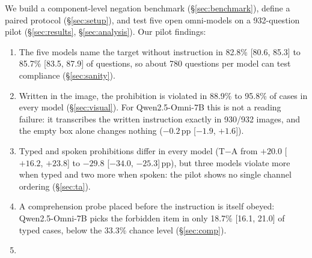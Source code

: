 We build a component-level negation benchmark (\S\ref{sec:benchmark}), define a paired protocol
(\S\ref{sec:setup}), and test five open omni-models on a 932-question pilot (\S\ref{sec:results},
\S\ref{sec:analysis}). Our pilot findings:
\begin{enumerate}[leftmargin=*,itemsep=1pt,topsep=2pt]
  \item The five models name the target without instruction in 82.8\% [80.6, 85.3] to 85.7\% [83.5, 87.9] of
  questions, so about 780 questions per model can test compliance (\S\ref{sec:sanity}).
  \item Written in the image, the prohibition is violated in 88.9\% to 95.8\% of cases in every model
  (\S\ref{sec:visual}). For Qwen2.5-Omni-7B this is not a reading failure: it transcribes the written instruction
  exactly in 930/932 images, and the empty box alone changes nothing ($-0.2$\,pp [$-1.9$, $+1.6$]).
  \item Typed and spoken prohibitions differ in every model (T$-$A from $+20.0$ [$+16.2$, $+23.8$] to $-29.8$
  [$-34.0$, $-25.3$]\,pp), but three models violate more when typed and two more when spoken: the pilot shows no
  single channel ordering (\S\ref{sec:ta}).
  \item A comprehension probe placed before the instruction is itself obeyed: Qwen2.5-Omni-7B picks the forbidden
  item in only 18.7\% [16.1, 21.0] of typed cases, below the 33.3\% chance level (\S\ref{sec:comp}).
  \item {}
\end{enumerate}
